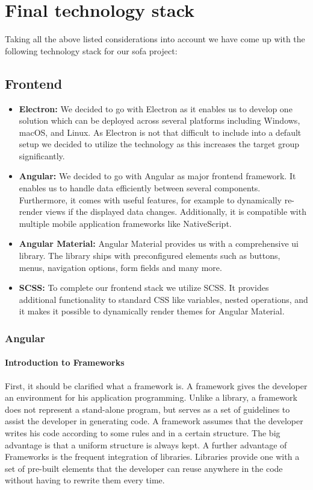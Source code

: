 \section{Final technology stack}\label{sec:final-technology-stack}

Taking all the above listed considerations into account we have come up with the following technology stack for our
\ac{sofa} project:

\subsection{Frontend}\label{subsec:frontend}

\begin{itemize}
    \item \textbf{Electron:} We decided to go with Electron as it enables us to develop one solution which can be
        deployed across several platforms including Windows, macOS, and Linux.
        As Electron is not that difficult to include into a default setup we decided to utilize the technology as this
        increases the target group significantly.
    \item \textbf{Angular:} We decided to go with Angular as major frontend framework.
        It enables us to handle data efficiently between several components.
        Furthermore, it comes with useful features, for example to dynamically re-render views if the displayed data
        changes.
        Additionally, it is compatible with multiple mobile application frameworks like NativeScript.
    \item \textbf{Angular Material:} Angular Material provides us with a comprehensive \ac{ui} library.
        The library ships with preconfigured elements such as buttons, menus, navigation options, form fields and many
        more.
    \item \textbf{SCSS:} To complete our frontend stack we utilize SCSS. It provides additional functionality to
        standard CSS like variables, nested operations, and it makes it possible to dynamically render themes for
        Angular Material.
\end{itemize}

\subsubsection{Angular}

\paragraph{Introduction to Frameworks}
First, it should be clarified what a framework is.
A framework gives the developer an environment for his application programming.
Unlike a library, a framework does not represent a stand-alone program, but serves as a set of guidelines to assist the
developer in generating code.
A framework assumes that the developer writes his code according to some rules and in a certain structure.
The big advantage is that a uniform structure is always kept.
A further advantage of Frameworks is the frequent integration of libraries.
Libraries provide one with a set of pre-built elements that the developer can reuse anywhere in the code without having
to rewrite them every time.


